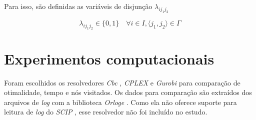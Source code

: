 \documentclass[]{article}
\newcommand{ \solver }[1]{\textit{#1}}
\newcommand{ \python }[1]{\textit{#1}}
\begin{document}
 			Para isso, são definidas as variáveis de disjunção $\lambda_{ij_1j_2}$
 			
 			\begin{equation}
 				\label{cflp:ms:ci:dom:var}		
 				\lambda_{ij_1j_2} \in \{ 0, 1 \}	
 				\quad
 				\forall i \in I, \langle j_1, j_2 \rangle \in \Gamma	
 			\end{equation}
\fi

		 
	\section{Experimentos computacionais}
	
		Foram escolhidos os resolvedores \solver{Cbc} \cite{Cbc}, \solver{CPLEX} \cite{CPLEX} e \solver{Gurobi} \cite{Gurobi} para comparação de otimalidade, tempo e nós visitados. 
		Os dados para comparação são extraídos dos arquivos de \textit{log} com a biblioteca \python{Orloge} \cite{orloge}. 
		Como ela não oferece suporte para leitura de \textit{log} do \solver{SCIP} \cite{SCIP}, esse resolvedor não foi incluído no estudo.
		
\end{document}
